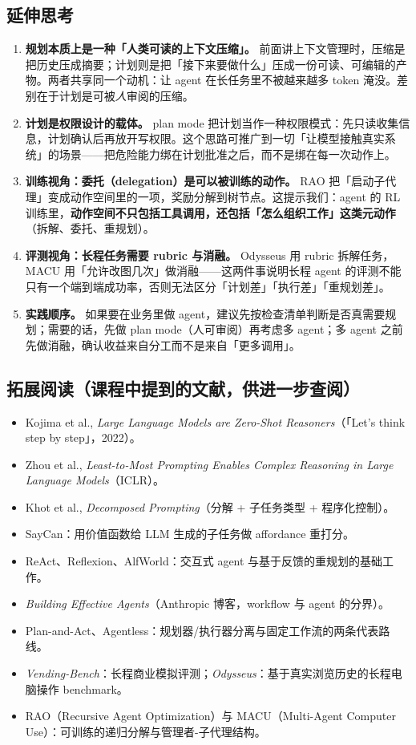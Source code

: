 \documentclass[a4paper]{article}
\begin{document}
\subsection{延伸思考}

\begin{enumerate}
\item \textbf{规划本质上是一种「人类可读的上下文压缩」。} 前面讲上下文管理时，压缩是把历史压成摘要；计划则是把「接下来要做什么」压成一份可读、可编辑的产物。两者共享同一个动机：让 agent 在长任务里不被越来越多 token 淹没。差别在于计划是可被\emph{人}审阅的压缩。
\item \textbf{计划是权限设计的载体。} plan mode 把计划当作一种权限模式：先只读收集信息，计划确认后再放开写权限。这个思路可推广到一切「让模型接触真实系统」的场景——把危险能力绑在计划批准之后，而不是绑在每一次动作上。
\item \textbf{训练视角：委托（delegation）是可以被训练的动作。} RAO 把「启动子代理」变成动作空间里的一项，奖励分解到树节点。这提示我们：agent 的 RL 训练里，\textbf{动作空间不只包括工具调用，还包括「怎么组织工作」这类元动作}（拆解、委托、重规划）。
\item \textbf{评测视角：长程任务需要 rubric 与消融。} Odysseus 用 rubric 拆解任务，MACU 用「允许改图几次」做消融——这两件事说明长程 agent 的评测不能只有一个端到端成功率，否则无法区分「计划差」「执行差」「重规划差」。
\item \textbf{实践顺序。} 如果要在业务里做 agent，建议先按检查清单判断是否真需要规划；需要的话，先做 plan mode（人可审阅）再考虑多 agent；多 agent 之前先做消融，确认收益来自分工而不是来自「更多调用」。
\end{enumerate}

\subsection{拓展阅读（课程中提到的文献，供进一步查阅）}

\begin{itemize}
\item Kojima et al., \emph{Large Language Models are Zero-Shot Reasoners}（「Let's think step by step」，2022）。
\item Zhou et al., \emph{Least-to-Most Prompting Enables Complex Reasoning in Large Language Models}（ICLR）。
\item Khot et al., \emph{Decomposed Prompting}（分解 + 子任务类型 + 程序化控制）。
\item SayCan：用价值函数给 LLM 生成的子任务做 affordance 重打分。
\item ReAct、Reflexion、AlfWorld：交互式 agent 与基于反馈的重规划的基础工作。
\item \emph{Building Effective Agents}（Anthropic 博客，workflow 与 agent 的分界）。
\item Plan-and-Act、Agentless：规划器/执行器分离与固定工作流的两条代表路线。
\item \emph{Vending-Bench}：长程商业模拟评测；\emph{Odysseus}：基于真实浏览历史的长程电脑操作 benchmark。
\item RAO（Recursive Agent Optimization）与 MACU（Multi-Agent Computer Use）：可训练的递归分解与管理者-子代理结构。
\end{itemize}
\end{document}
